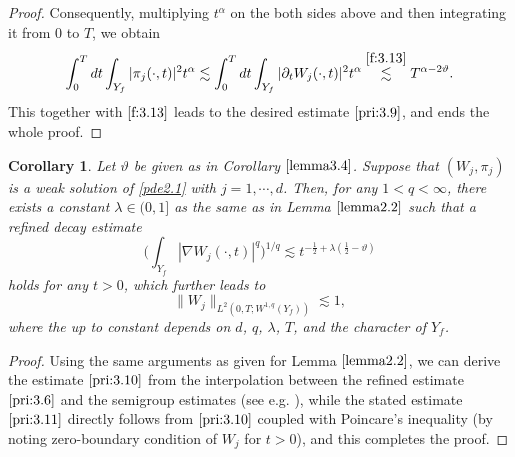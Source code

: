 \documentclass[13pt,CJK]{article}
\theoremstyle{plain}                       %
\newtheorem{corollary}[lemma]{Corollary}
\theoremstyle{remark}
\numberwithin{equation}{section}
\begin{document}
\begin{proof}
Consequently, multiplying $t^\alpha$ on the both sides above and then integrating it
from $0$ to $T$, we obtain
\begin{equation*}
\int_{0}^{T}dt\int_{Y_f}|\pi_j(\cdot,t)|^2t^\alpha
\lesssim \int_{0}^{T}dt\int_{Y_f}|\partial_t W_j(\cdot,t)|^2t^\alpha
\overset{\eqref{f:3.13}}{\lesssim} T^{\alpha-2\vartheta}.
\end{equation*}
This together with $\eqref{f:3.13}$ leads to
the desired estimate $\eqref{pri:3.9}$, and ends the whole proof.
\end{proof}


\begin{corollary}\label{cor:1}
Let $\vartheta$ be given as in Corollary $\ref{lemma3.4}$.
Suppose that $(W_j,\pi_j)$ is a weak solution of \eqref{pde2.1}
with $j=1,\cdots,d$. Then,
for any $1<q<\infty$,
there exists a constant $\lambda\in(0,1]$ as the same as in
Lemma $\ref{lemma2.2}$ such that
a refined decay estimate
\begin{equation}\label{pri:3.10}
\bigg(\int_{Y_f}|\nabla W_j(\cdot, t)|^q\bigg)^{1/q}
\lesssim t^{-\frac{1}{2}+\lambda(\frac{1}{2}-\vartheta)}
\end{equation}
holds for any $t>0$, which further leads to
\begin{equation}\label{pri:3.11}
\|W_j\|_{L^{2}(0,T;W^{1,q}(Y_f))}\lesssim 1,
\end{equation}
where the up to constant depends on $d$, $q$, $\lambda$, $T$, and the character of $Y_f$.
\end{corollary}

\begin{proof}
Using the same arguments as given for Lemma $\ref{lemma2.2}$, we can
derive the estimate $\eqref{pri:3.10}$ from the interpolation between the
refined estimate $\eqref{pri:3.6}$ and the semigroup estimates (see e.g. 
\cite[Lemma 5.1]{Tsai18}), while the stated estimate $\eqref{pri:3.11}$ directly follows from
$\eqref{pri:3.10}$ coupled with Poincare's inequality (by noting zero-boundary
condition of $W_j$ for $t>0$), and this completes the proof.
\end{proof}
\end{document}
